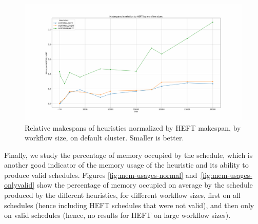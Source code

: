 \documentclass[conference]{IEEEtran}
\newcommand{\algo}[1]{\textsc{#1}}
\newcommand{\heft}{\algo{HEFT}\xspace}
\newcommand{\skug}[1]{{\color{blue}[SK: #1]}}
\begin{document}


%


    \begin{figure}[tb]
        \centering
        \includegraphics[width=1.1\columnwidth] {images/makespan_relations_by_wf_size}
        \caption{Relative makespans of heuristics normalized by \heft makespan, by workflow
        size, on default cluster. Smaller is better.}
        \label{fig:ms-relations-by-workflow}
        \vspace{-0.3cm}
    \end{figure}


    Finally, we study the percentage of memory occupied by the schedule, which is another good indicator
    of the memory usage of the heuristic and its ability to produce valid schedules.  %
    Figures \ref{fig:mem-usages-normal} and~\ref{fig:mem-usages-onlyvalid} show the percentage of memory
    occupied on average by the schedule
    produced by the different heuristics, for different workflow sizes, first on all schedules (hence including
    \heft schedules that were not valid), and then only on valid schedules (hence, no results for \heft
    on large workflow sizes).
%
\end{document}
